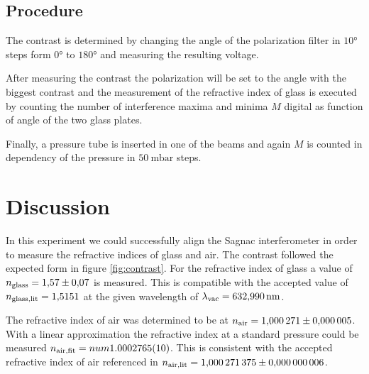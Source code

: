 \subsection{Procedure}
The contrast is determined by changing the angle of the polarization filter in
$10°$ steps form $0°$ to $180°$ and measuring the resulting voltage.

After measuring the contrast the polarization will be set to the angle with the
biggest contrast and the measurement of the refractive index of glass is
executed by counting the number of interference maxima and minima $M$ digital
as function of angle of the two glass plates.

Finally, a pressure tube is inserted in one of the beams and again $M$ is
counted in dependency of the pressure in $\qty{50}{\milli\bar}$ steps.

\newpage



\section{Discussion}
In this experiment we could successfully align the Sagnac interferometer in
order to measure the refractive indices of glass and air.
The contrast followed the expected form in figure \ref{fig:contrast}.
For the refractive
index of glass a value of $n_\t{glass} = \num{1.57(7)}$ is measured. This is
compatible with the accepted value of $n_\t{glass,lit} = \num{1.5151}$
\cite{web:refglass} at the given wavelength of $\lambda_\t{vac} = \qty{632,990}{\nm}$.

The refractive index of air was determined to be at $n_\t{air}=\num{1.000271(5)}$. 
With a linear approximation the refractive index at a standard pressure
could be measured $n_\t{air,fit} = num{1.0002765 (10)}$. This is consistent with
the accepted refractive index of air referenced in \cite*{atc:2011AmJP}
$n_\t{air,lit} = \num{1.000271375(6)}$. 


\printbibliography


